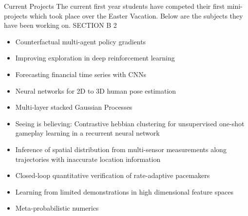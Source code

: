 \documentclass[10pt,final]{papertex}
\begin{document}
\begin{news}{2}
	{Current Projects}
	{The current first year students have competed their first mini-projects which took place over the Easter Vacation.  Below are the subjects they have been working on. }
	{SECTION B}
	{2}



\noindent 
\begin{itemize}
\item Counterfactual multi-agent policy gradients\\
\item Improving exploration in deep reinforcement learning\\
\item Forecasting financial time series with CNNs\\
\item Neural networks for 2D to 3D human pose estimation\\
\item Multi-layer stacked Gaussian Processes\\
\item Seeing is believing: Contrastive hebbian clustering for unsupervised one-shot gameplay learning in a recurrent neural network\\
\item Inference of spatial distribution from multi-sensor measurements along trajectories with inaccurate location information\\
\item Closed-loop quantitative verification of rate-adaptive pacemakers\\
\item Learning from limited demonstrations in high dimensional feature spaces\\
\item Meta-probabilistic numerics\\
\end{itemize}

%
%
%


\end{news}
\end{document}
